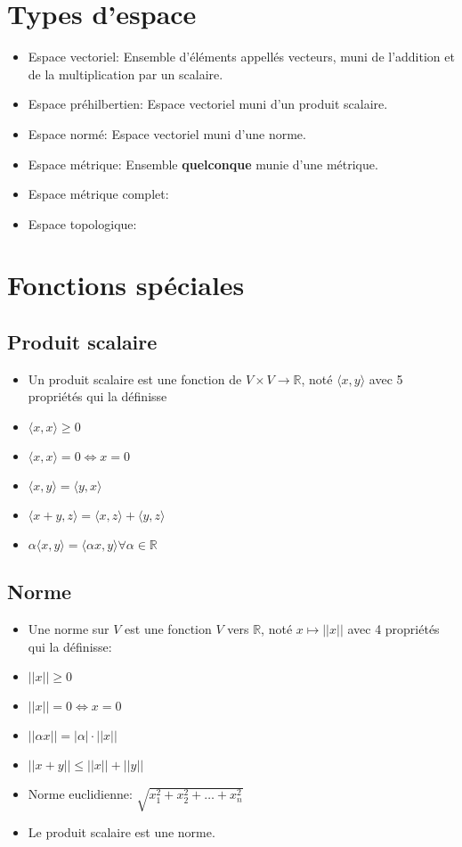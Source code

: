 \documentclass[12pt]{book}
\let\Bbb\mathbb
\theoremstyle{definition}
\begin{document}
\section{Types d'espace}
\begin{itemize}
    \item Espace vectoriel: Ensemble d'éléments appellés vecteurs, muni de l'addition et de la multiplication par un scalaire.
    \item Espace préhilbertien: Espace vectoriel muni d'un produit scalaire.
    \item Espace normé: Espace vectoriel muni d'une norme.
    \item Espace métrique: Ensemble \textbf{quelconque} munie d'une métrique.
    \item Espace métrique complet:
    \item Espace topologique:
\end{itemize}
\section{Fonctions spéciales}
\subsection{Produit scalaire}
\begin{itemize}
    \item Un produit scalaire est une fonction de $V \times V \to \Bbb R$, noté $\langle x, y \rangle$ avec 5 propriétés qui la définisse
    \item $\langle x, x \rangle \geq 0$
    \item $\langle x, x \rangle = 0 \iff x = 0$
    \item $\langle x, y \rangle = \langle y, x \rangle$
    \item $\langle x + y, z\rangle = \langle x, z \rangle + \langle y, z \rangle$
    \item $\alpha\langle x, y \rangle = \langle \alpha x, y \rangle \forall \alpha \in \Bbb R$
\end{itemize}
\subsection{Norme}
\begin{itemize}
    \item Une norme sur $V$ est une fonction $V$ vers $\Bbb R$, noté $x \mapsto ||x||$ avec 4 propriétés qui la définisse:
    \item $||x|| \geq 0$
    \item $||x|| = 0 \iff x = 0$
    \item $||\alpha x|| = |\alpha| \cdot ||x||$
    \item $||x + y || \leq ||x|| + ||y||$
    \item Norme euclidienne: $\sqrt{x_1^2 + x_2^2 + \dots + x_n^2}$
    \item Le produit scalaire est une norme.
\end{itemize}
\end{document}
